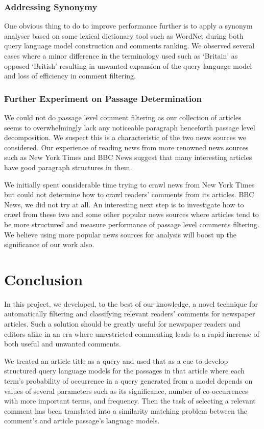 \documentclass[article]{IEEEtran}
\begin{document}
\subsubsection{Addressing Synonymy}
One obvious thing to do to improve performance further is to apply a synonym analyser based on some lexical dictionary tool such as WordNet \cite{Miller:1995:WLD:219717.219748} during both query language model construction and comments ranking. We observed several cases where a minor difference in the terminology used such as `Britain' as opposed `British' resulting in unwanted expansion of the query language model and loss of efficiency in comment filtering.    

\subsubsection{Further Experiment on Passage Determination} We could not do passage level comment filtering as our collection of articles seems to overwhelmingly lack any noticeable paragraph henceforth passage level decomposition. We suspect this is a characteristic of the two news sources we considered. Our experience of reading news from more renowned news sources such as New York Times and BBC News suggest that many interesting articles have good paragraph structures in them. 

We initially spent considerable time trying to crawl news from New York Times but could not determine how to crawl readers' comments from its articles. BBC News, we did not try at all. An interesting next step is to investigate how to crawl from these two and some other popular news sources where articles tend to be more structured and measure performance of passage level comments filtering. We believe using more popular news sources for analysis will boost up the significance of our work also.     
 
\section{Conclusion}
\label{con}
In this project, we developed, to the best of our knowledge, a novel technique for automatically filtering and classifying relevant readers' comments for newspaper articles. Such a solution should be greatly useful for newspaper readers and editors alike in an era where unrestricted commenting leads to a rapid increase of both useful and unwanted comments.

We treated an article title as a query and used that as a cue to develop structured query language models for the passages in that article where each term's probability of occurrence in a query generated from a model depends on values of several parameters such as its significance, number of co-occurrences with more important terms, and frequency. Then the task of selecting a relevant comment has been translated into a similarity matching problem between the comment's and article passage's language models. 
\end{document}
